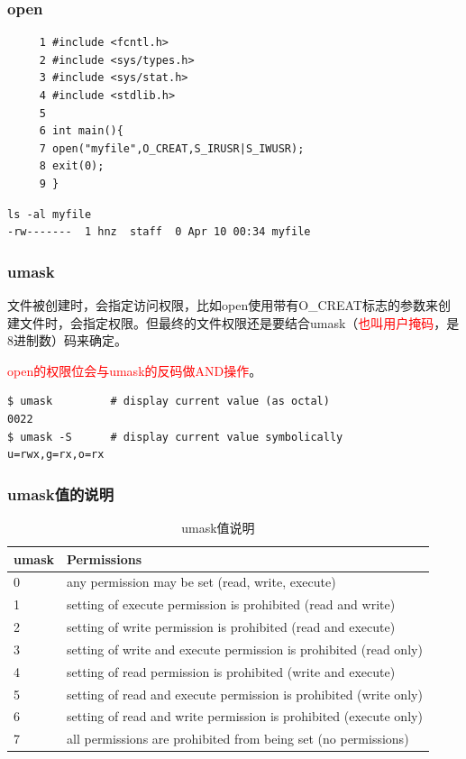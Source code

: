 \documentclass{beamer}
\begin{document}
\begin{frame}[fragile]
\frametitle{open}
\begin{example}[open系统调用的使用实例]
\begin{verbatim}
     1 #include <fcntl.h>
     2 #include <sys/types.h>
     3 #include <sys/stat.h>
     4 #include <stdlib.h>
     5
     6 int main(){
     7 open("myfile",O_CREAT,S_IRUSR|S_IWUSR);
     8 exit(0);
     9 }
\end{verbatim}
\end{example}

\begin{lstlisting}
ls -al myfile 
-rw-------  1 hnz  staff  0 Apr 10 00:34 myfile
\end{lstlisting}
\end{frame}
\begin{frame}[fragile]
\frametitle{umask}
文件被创建时，会指定访问权限，比如open使用带有O\_CREAT标志的参数来创建文件时，会指定权限。但最终的文件权限还是要结合umask（\textcolor{red}{也叫用户掩码}，是8进制数）码来确定。

\textcolor{red}{open的权限位会与umask的反码做AND操作}。
\begin{lstlisting}
$ umask         # display current value (as octal)
0022
$ umask -S      # display current value symbolically
u=rwx,g=rx,o=rx
\end{lstlisting}
\end{frame}
\begin{frame}
\frametitle{umask值的说明}
\begin{table}
\begin{tabular}{ll}
\toprule
\textbf{umask } & \textbf{Permissions}\\
\midrule
0 & any permission may be set (read, write, execute)\\
1 & setting of execute permission is prohibited (read and write)\\
2 & setting of write permission is prohibited (read and execute)\\
3 & setting of write and execute permission is prohibited (read only)\\
4 & setting of read permission is prohibited (write and execute)\\
5 & setting of read and execute permission is prohibited (write only)\\
6 & setting of read and write permission is prohibited (execute only)\\
7 & all permissions are prohibited from being set (no permissions)\\
\bottomrule
\end{tabular}
\caption{umask值说明}
\end{table}
\end{frame}
\end{document}
